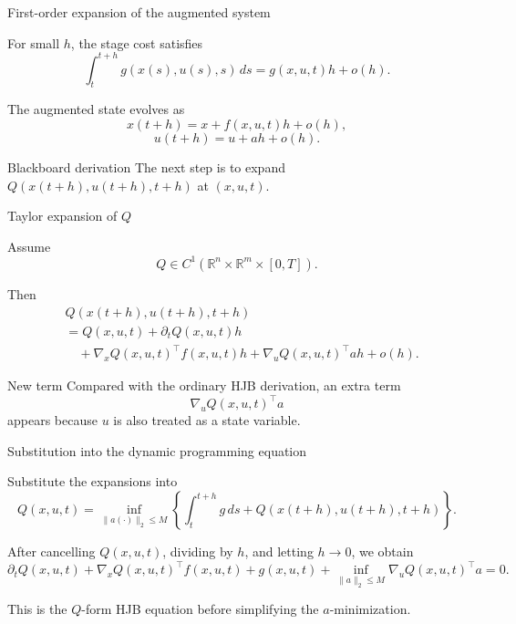 \documentclass[aspectratio=169]{beamer}
\begin{document}
\begin{frame}{First-order expansion of the augmented system}

For small \(h\), the stage cost satisfies
\[
\int_t^{t+h} g(x(s),u(s),s)\,ds
=
g(x,u,t)h+o(h).
\]

\vspace{0.2cm}

The augmented state evolves as
\[
x(t+h)
=
x+f(x,u,t)h+o(h),
\]
\[
u(t+h)
=
u+a h+o(h).
\]

\vspace{0.2cm}

\begin{alertblock}{Blackboard derivation}
\small
The next step is to expand \(Q(x(t+h),u(t+h),t+h)\) at \((x,u,t)\).
\end{alertblock}

\end{frame}


\begin{frame}{Taylor expansion of \(Q\)}

Assume
\[
Q\in C^1(\mathbb R^n\times\mathbb R^m\times[0,T]).
\]

Then
\[
\begin{aligned}
&Q(x(t+h),u(t+h),t+h)
\\
&=
Q(x,u,t)
+
\partial_t Q(x,u,t)h
\\
&\quad
+
\nabla_x Q(x,u,t)^\top f(x,u,t)h
+
\nabla_u Q(x,u,t)^\top a h
+
o(h).
\end{aligned}
\]

\vspace{0.15cm}

\begin{block}{New term}
\small
Compared with the ordinary HJB derivation, an extra term
\[
\nabla_u Q(x,u,t)^\top a
\]
appears because \(u\) is also treated as a state variable.
\end{block}

\end{frame}


\begin{frame}{Substitution into the dynamic programming equation}

Substitute the expansions into
\[
Q(x,u,t)
=
\inf_{\|a(\cdot)\|_2\le M}
\left\{
\int_t^{t+h}g\,ds
+
Q(x(t+h),u(t+h),t+h)
\right\}.
\]

\vspace{0.15cm}

After cancelling \(Q(x,u,t)\), dividing by \(h\), and letting \(h\to0\), we obtain
\[
\partial_t Q(x,u,t)
+
\nabla_x Q(x,u,t)^\top f(x,u,t)
+
g(x,u,t)
+
\inf_{\|a\|_2\le M}
\nabla_u Q(x,u,t)^\top a
=
0.
\]

\vspace{0.15cm}

\begin{block}{This is the \(Q\)-form HJB equation before simplifying the \(a\)-minimization.}
\end{block}

\end{frame}
\end{document}
